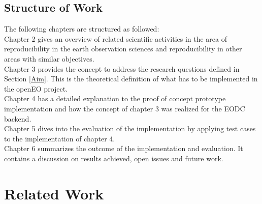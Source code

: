 \documentclass[draft,final]{vutinfth} %
\begin{document}
\section{Structure of Work}\label{Structure}
The following chapters are structured as followed:\\
Chapter 2 gives an overview of related scientific activities in the area of reproducibility in the earth observation sciences and reproducibility in other areas with similar objectives. \\
Chapter 3 provides the concept to address the research questions defined in Section \ref{Aim}.  This is the theoretical definition of what has to be implemented in the openEO project.\\
Chapter 4 has a detailed explanation to the proof of concept prototype implementation and how the concept of chapter 3 was realized for the EODC backend. \\
Chapter 5 dives into the evaluation of the implementation by applying test cases to the implementation of chapter 4.\\
Chapter 6 summarizes the outcome of the implementation and evaluation. It contains a discussion on results achieved, open issues and future work. \\

\chapter{Related Work}\label{Related Work}

\end{document}
